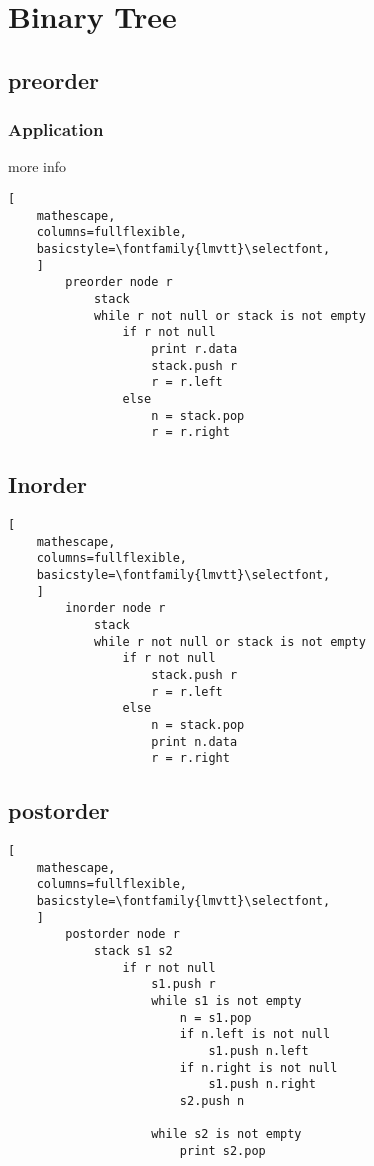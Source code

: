 \documentclass{article}
\begin{document}
\pagebreak
\section{Binary Tree} 
\subsection{preorder}
\subsubsection{Application}
more info
\begin{lstlisting}[
    mathescape,
    columns=fullflexible,
    basicstyle=\fontfamily{lmvtt}\selectfont,
    ]
        preorder node r
            stack
            while r not null or stack is not empty
                if r not null
                    print r.data
                    stack.push r
                    r = r.left
                else
                    n = stack.pop
                    r = r.right

\end{lstlisting} 

\subsection{Inorder}
\begin{lstlisting}[
    mathescape,
    columns=fullflexible,
    basicstyle=\fontfamily{lmvtt}\selectfont,
    ]
        inorder node r
            stack
            while r not null or stack is not empty
                if r not null 
                    stack.push r
                    r = r.left
                else
                    n = stack.pop
                    print n.data
                    r = r.right

\end{lstlisting} 

\subsection{postorder}
\begin{lstlisting}[
    mathescape,
    columns=fullflexible,
    basicstyle=\fontfamily{lmvtt}\selectfont,
    ]
        postorder node r
            stack s1 s2
                if r not null
                    s1.push r
                    while s1 is not empty
                        n = s1.pop
                        if n.left is not null
                            s1.push n.left
                        if n.right is not null
                            s1.push n.right
                        s2.push n

                    while s2 is not empty
                        print s2.pop

\end{lstlisting} 
\end{document}
